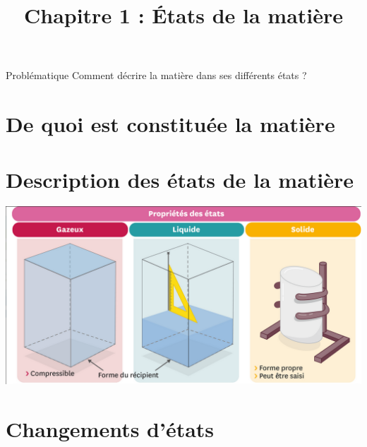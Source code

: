 \documentclass[xcolor={dvipsnames}]{beamer}
\title{Chapitre 1 : \'Etats de la matière}
\begin{document}
\begin{frame}
  \titlepage 
\end{frame}


\begin{frame}
\begin{block}{Problématique}
	{\Large Comment décrire la matière dans ses différents états ?}
\end{block}
\end{frame}


\section{De quoi est constituée la matière}




\begin{frame}
	
\end{frame}



\section{Description des états de la matière}

\begin{frame}
	
\end{frame}

\begin{frame}
	\begin{center}
		\includegraphics[scale=0.4]{etats}
	\end{center}
\end{frame}

\section{Changements d'états}
\begin{frame}

	

\end{frame}
\end{document}
